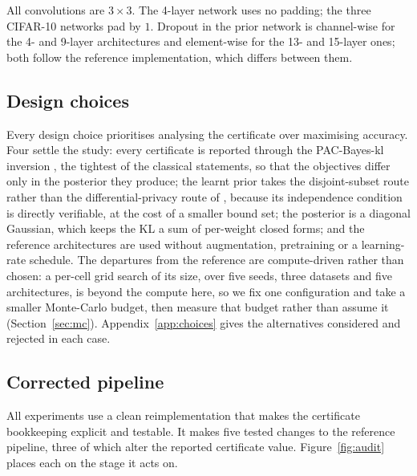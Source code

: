 \begin{table}[h]
\smallskip
\footnotesize All convolutions are $3\!\times\!3$. The 4-layer network uses no
padding; the three CIFAR-10 networks pad by $1$. Dropout in the prior network is
channel-wise for the 4- and 9-layer architectures and element-wise for the 13-
and 15-layer ones; both follow the reference implementation, which differs
between them.
\end{table}

\subsection{Design choices}\label{sec:choices}

Every design choice prioritises analysing the certificate over maximising
accuracy. Four settle the study: every certificate is reported through the
PAC-Bayes-kl inversion \parencite{maurer2004,seeger2002}, the tightest of the
classical statements, so that the objectives differ only in the posterior they
produce; the learnt prior takes the disjoint-subset route rather than the
differential-privacy route of \textcite{dziugaite2018}, because its independence
condition is directly verifiable, at the cost of a smaller bound set; the
posterior is a diagonal Gaussian, which keeps the KL a sum of per-weight closed
forms; and the reference architectures are used without augmentation,
pretraining or a learning-rate schedule. The departures from the reference are
compute-driven rather than chosen: a per-cell grid search of its size, over
five seeds, three datasets and five architectures, is beyond the compute here, so
we fix one configuration and take a smaller Monte-Carlo budget, then measure that
budget rather than assume it (Section~\ref{sec:mc}). Appendix~\ref{app:choices}
gives the alternatives considered and rejected in each case.

\subsection{Corrected pipeline}\label{sec:pipeline}

All experiments use a clean reimplementation that makes the certificate
bookkeeping explicit and testable. It makes five tested changes to the reference
pipeline, three of which alter the reported certificate value.
Figure~\ref{fig:audit} places each on the stage it acts on.

